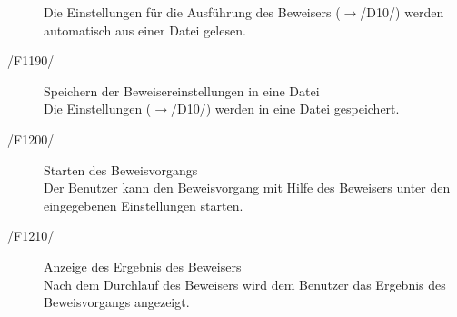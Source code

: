 \documentclass[a4paper,10pt]{article}
\begin{document}
\begin{description}
Die Einstellungen f\"{u}r die Ausf\"{u}hrung des Beweisers ($\to$/D10/) werden automatisch aus einer Datei gelesen.
\item[/F1190/] Speichern der Beweisereinstellungen in eine Datei\\
Die Einstellungen ($\to$/D10/) werden in eine Datei gespeichert.
\item[/F1200/] Starten des Beweisvorgangs\\
Der Benutzer kann den Beweisvorgang mit Hilfe des Beweisers unter den eingegebenen Einstellungen starten.
\item[/F1210/] Anzeige des Ergebnis des Beweisers\\
Nach dem Durchlauf des Beweisers wird dem Benutzer das Ergebnis des Beweisvorgangs angezeigt.
\end{description}
\end{document}
